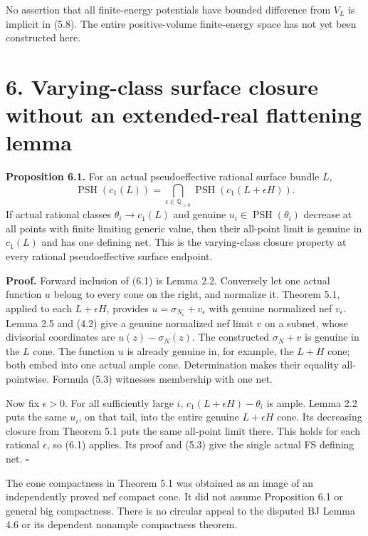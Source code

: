 \documentclass[
  10pt,
]{article}
\begin{document}
No assertion that all finite-energy potentials have bounded difference
from \(V_L\) is implicit in (5.8). The entire positive-volume
finite-energy space has not yet been constructed here.

\section{6. Varying-class surface closure without an extended-real
flattening
lemma}\label{varying-class-surface-closure-without-an-extended-real-flattening-lemma}

\textbf{Proposition 6.1.} For an actual pseudoeffective rational surface
bundle \(L\), \[
 \operatorname{PSH}(c_1(L))
   =\bigcap_{\epsilon\in\mathbb Q_{>0}}
                      \operatorname{PSH}(c_1(L+\epsilon H)).      \tag{6.1}
\] If actual rational classes \(\theta_i\to c_1(L)\) and genuine
\(u_i\in\operatorname{PSH}(\theta_i)\) decrease at all points with
finite limiting generic value, then their all-point limit is genuine in
\(c_1(L)\) and has one defining net. This is the varying-class closure
property at every rational pseudoeffective surface endpoint.

\textbf{Proof.} Forward inclusion of (6.1) is Lemma 2.2. Conversely let
one actual function \(u\) belong to every cone on the right, and
normalize it. Theorem 5.1, applied to each \(L+\epsilon H\), provides
\(u=\sigma_{N_\epsilon}+v_\epsilon\) with genuine normalized nef
\(v_\epsilon\). Lemma 2.5 and (4.2) give a genuine normalized nef limit
\(v\) on a subnet, whose divisorial coordinates are
\(u(z)-\sigma_N(z)\). The constructed \(\sigma_N+v\) is genuine in the
\(L\) cone. The function \(u\) is already genuine in, for example, the
\(L+H\) cone; both embed into one actual ample cone. Determination makes
their equality all-pointwise. Formula (5.3) witnesses membership with
one net.

Now fix \(\epsilon>0\). For all sufficiently large \(i\),
\(c_1(L+\epsilon H)-\theta_i\) is ample. Lemma 2.2 puts the same
\(u_i\), on that tail, into the entire genuine \(L+\epsilon H\) cone.
Its decreasing closure from Theorem 5.1 puts the same all-point limit
there. This holds for each rational \(\epsilon\), so (6.1) applies. Its
proof and (5.3) give the single actual FS defining net. \(\square\)

The cone compactness in Theorem 5.1 was obtained as an image of an
independently proved nef compact cone. It did not assume Proposition 6.1
or general big compactness. There is no circular appeal to the disputed
BJ Lemma 4.6 or its dependent nonample compactness theorem.
\end{document}
